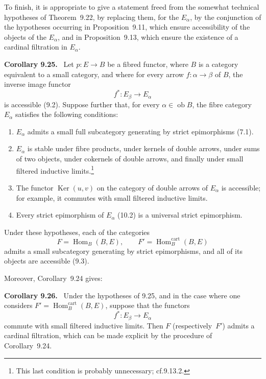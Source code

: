 \documentclass[11pt]{article}
\newcommand{\ob}{\operatorname{ob}}
\newcommand{\Ker}{\operatorname{Ker}}
\newcommand{\Hhom}{\operatorname{Hom}}
\newcommand{\Hhomcart}{\operatorname{Hom}^{\mathrm{cart}}}
\newcommand{\cf}{cf.}
\newcommand{\resp}{respectively\ }
\newenvironment{statement}[1]{\par\medskip\noindent\textbf{#1.}\ }{\par\medskip}
\begin{document}
To finish, it is appropriate to give a statement freed from the somewhat technical hypotheses of Theorem~9.22, by replacing them, for the $E_\alpha$, by the conjunction of the hypotheses occurring in Proposition~9.11, which ensure accessibility of the objects of the $E_\alpha$, and in Proposition~9.13, which ensure the existence of a cardinal filtration in $E_\alpha$.

\begin{statement}{Corollary 9.25}
Let $p:E\to B$ be a fibred functor, where $B$ is a category equivalent to a small category, and where for every arrow $f:\alpha\to\beta$ of $B$, the inverse image functor
\[
 f^\ast:E_\beta\to E_\alpha
\]
is accessible (9.2). Suppose further that, for every $\alpha\in\ob B$, the fibre category $E_\alpha$ satisfies the following conditions:
\begin{enumerate}[label=\alph*)]
\item $E_\alpha$ admits a small full subcategory generating by strict epimorphisms (7.1).
\item $E_\alpha$ is stable under fibre products, under kernels of double arrows, under sums of two objects, under cokernels of double arrows, and finally under small filtered inductive limits.\footnote{This last condition is probably unnecessary; \cf 9.13.2.}
\item The functor $\Ker(u,v)$ on the category of double arrows of $E_\alpha$ is accessible; for example, it commutes with small filtered inductive limits.
\item Every strict epimorphism of $E_\alpha$ (10.2) is a universal strict epimorphism.
\end{enumerate}
Under these hypotheses, each of the categories
\[
 F=\Hhom_B(B,E),\qquad F'=\Hhomcart_B(B,E)
\]
admits a small subcategory generating by strict epimorphisms, and all of its objects are accessible (9.3).
\end{statement}

Moreover, Corollary~9.24 gives:

\begin{statement}{Corollary 9.26}
Under the hypotheses of 9.25, and in the case where one considers $F'=\Hhomcart_B(B,E)$, suppose that the functors
\[
 f^\ast:E_\beta\to E_\alpha
\]
commute with small filtered inductive limits. Then $F$ (\resp $F'$) admits a cardinal filtration, which can be made explicit by the procedure of Corollary~9.24.
\end{statement}

\bigskip
\end{document}
